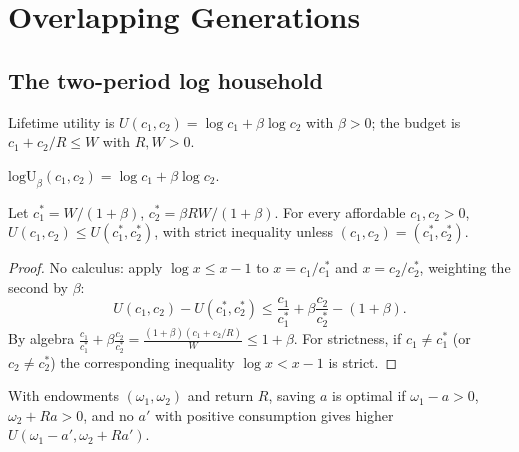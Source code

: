 \chapter{Overlapping Generations}
\label{chap:olg}

\section{The two-period log household}
\label{sec:log_household}

Lifetime utility is $U(c_1, c_2) = \log c_1 + \beta \log c_2$ with $\beta > 0$; the budget is
$c_1 + c_2/R \le W$ with $R, W > 0$.

\begin{definition}
\label{def:logU}
\leanok
$\mathrm{logU}_\beta(c_1, c_2) = \log c_1 + \beta \log c_2$.
\end{definition}

\begin{theorem}
\label{thm:logU_opt}
\leanok
{}
Let $c_1^* = W/(1+\beta)$, $c_2^* = \beta R W/(1 + \beta)$. For every affordable $c_1, c_2 > 0$,
$U(c_1, c_2) \le U(c_1^*, c_2^*)$, with strict inequality unless $(c_1, c_2) = (c_1^*, c_2^*)$.
\end{theorem}
\begin{proof}
\leanok
No calculus: apply $\log x \le x - 1$ to $x = c_1/c_1^*$ and $x = c_2/c_2^*$, weighting the second by $\beta$:
\[
  U(c_1, c_2) - U(c_1^*, c_2^*) \le \frac{c_1}{c_1^*} + \beta\frac{c_2}{c_2^*} - (1 + \beta).
\]
By algebra $\frac{c_1}{c_1^*} + \beta \frac{c_2}{c_2^*} = \frac{(1+\beta)(c_1 + c_2/R)}{W} \le 1 + \beta$.
For strictness, if $c_1 \neq c_1^*$ (or $c_2 \neq c_2^*$) the corresponding inequality $\log x < x - 1$ is strict.
\end{proof}

\begin{definition}
\label{def:isOptimalSaving}
\leanok
{}
With endowments $(\omega_1, \omega_2)$ and return $R$, saving $a$ is optimal if $\omega_1 - a > 0$,
$\omega_2 + R a > 0$, and no $a'$ with positive consumption gives higher $U(\omega_1 - a', \omega_2 + R a')$.
\end{definition}

